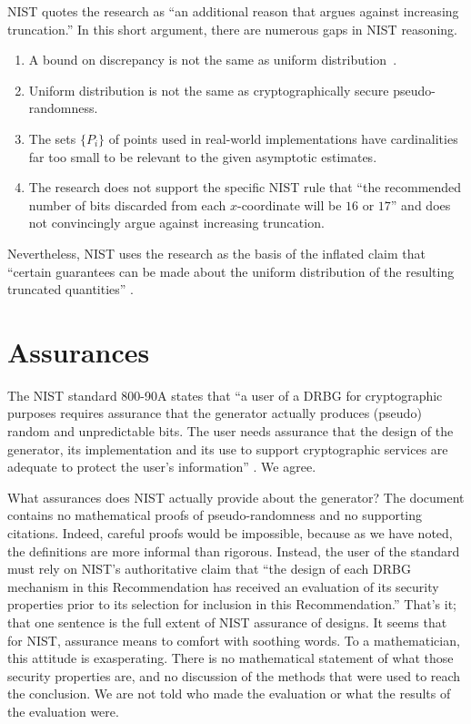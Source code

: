 \documentclass[11pt]{amsart} %
\begin{document}
NIST quotes the research \cite{MS2000} as ``an additional reason that argues against increasing truncation.''
In this short argument, there are numerous gaps in NIST reasoning.
\begin{enumerate}
\item A bound on discrepancy is not the same as uniform distribution~\cite{SDA1651}.
\item Uniform distribution is not the same as cryptographically secure pseudo-randomness.
\item The sets $\{P_i\}$ of points  used in real-world implementations have cardinalities far too small to
be relevant to the given asymptotic estimates.
\item The research does not support the specific NIST rule that ``the recommended number of bits discarded
from each $x$-coordinate will be $16$ or $17$'' and does not convincingly argue against increasing truncation.
\end{enumerate}
Nevertheless, NIST uses the research as the basis of the inflated claim that ``certain
guarantees can be made about the uniform distribution of the resulting truncated quantities'' \cite{NIST}.

\section{Assurances}

The NIST standard 800-90A states that ``a user of a DRBG for cryptographic purposes requires assurance
that the generator actually produces (pseudo) random and unpredictable bits.  The user needs assurance
that the design of the generator, its implementation and its use to support cryptographic services are
adequate to protect the user's information'' \cite{NIST}. We agree.

What assurances does NIST actually provide about the generator?  
The document contains no mathematical proofs of pseudo-randomness and no supporting citations.  
Indeed, careful proofs would be impossible,
because as we have noted,
the definitions are more informal than rigorous.  Instead, the user of the standard must
rely on NIST's authoritative claim that ``the design of each DRBG mechanism in this Recommendation has
received an evaluation of its security properties prior to its selection for inclusion in this Recommendation.''
That's it;  that one sentence is the full extent of NIST assurance of designs.   It seems that for NIST,
assurance means to comfort with soothing words. To a mathematician, this attitude is exasperating.
 There is no mathematical statement of what
those security properties are, and no discussion of the methods that were used to reach the conclusion.
We are not told who made the evaluation or what the results of the evaluation were.
\end{document}

